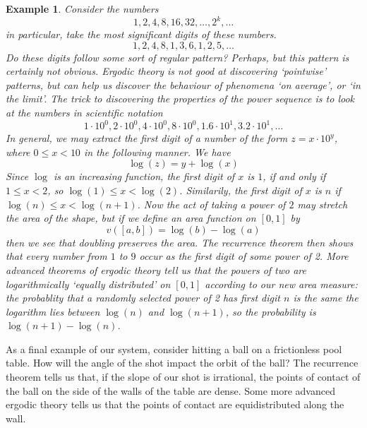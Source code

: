 \documentclass{article}
\theoremstyle{plain}
\newtheorem*{example}{Example}
\theoremstyle{definition}
\begin{document}
\begin{example}
    Consider the numbers
    \[ 1, 2, 4, 8, 16, 32, \dots, 2^k, \dots \]
    in particular, take the most significant digits of these numbers.
    \[ 1, 2, 4, 8, 1, 3, 6, 1, 2, 5, \dots \]
    Do these digits follow some sort of regular pattern? Perhaps, but this pattern is certainly not obvious. Ergodic theory is not good at discovering `pointwise' patterns, but can help us discover the behaviour of phenomena `on average', or `in the limit'. The trick to discovering the properties of the power sequence is to look at the numbers in scientific notation
    \[ 1 \cdot 10^0, 2 \cdot 10^0, 4 \cdot 10^0, 8 \cdot 10^0, 1.6 \cdot 10^1, 3.2 \cdot 10^1, \dots \]
    In general, we may extract the first digit of a number of the form $z = x \cdot 10^y$, where $0 \leq x < 10$ in the following manner. We have
    \[ \log(z) = y + \log(x) \]
    Since $\log$ is an increasing function, the first digit of $x$ is $1$, if and only if $1 \leq x < 2$, so $\log(1) \leq x < \log(2)$. Similarily, the first digit of $x$ is $n$ if $\log(n) \leq x < \log(n+1)$. Now the act of taking a power of $2$ may stretch the area of the shape, but if we define an area function on $[0,1]$ by
    \[ v([a,b]) = \log(b) - \log(a) \]
    then we see that doubling preserves the area. The recurrence theorem then shows that every number from $1$ to $9$ occur as the first digit of some power of 2. More advanced theorems of ergodic theory tell us that the powers of two are logarithmically `equally distributed' on $[0,1]$ according to our new area measure: the probablity that a randomly selected power of 2 has first digit $n$ is the same the logarithm lies between $\log(n)$ and $\log(n+1)$, so the probability is $\log(n+1) - \log(n)$.
\end{example}

As a final example of our system, consider hitting a ball on a frictionless pool table. How will the angle of the shot impact the orbit of the ball? The recurrence theorem tells us that, if the slope of our shot is irrational, the points of contact of the ball on the side of the walls of the table are dense. Some more advanced ergodic theory tells us that the points of contact are equidistributed along the wall.
\end{document}
